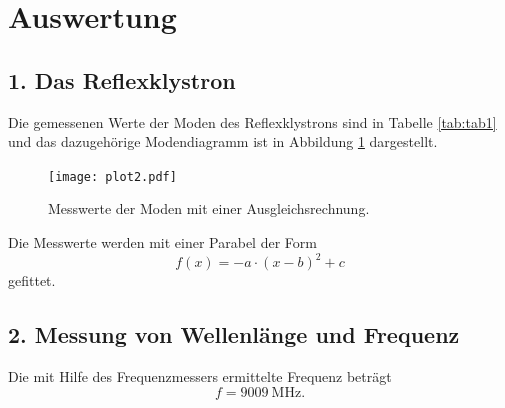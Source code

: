 \section{Auswertung}
\label{sec:Auswertung}
\subsection{1. Das Reflexklystron}

Die gemessenen Werte der Moden des Reflexklystrons sind in Tabelle \ref{tab:tab1} und das
dazugehörige Modendiagramm ist in Abbildung \ref{fig:Mode} dargestellt.

\begin{figure}[H]
  \centering
  \texttt{[image: plot2.pdf]}
  \caption{Messwerte der Moden mit einer Ausgleichsrechnung.}
  \label{fig:Mode}
\end{figure}
Die Messwerte werden mit einer Parabel der Form
\begin{equation}
  f(x)=-a\cdot(x-b)^2 +c
\end{equation}
gefittet.

\subsection{2. Messung von Wellenlänge und Frequenz }

Die mit Hilfe des Frequenzmessers ermittelte Frequenz beträgt
\begin{equation}
  f=\SI{9009}{\MHz}.
\end{equation}

